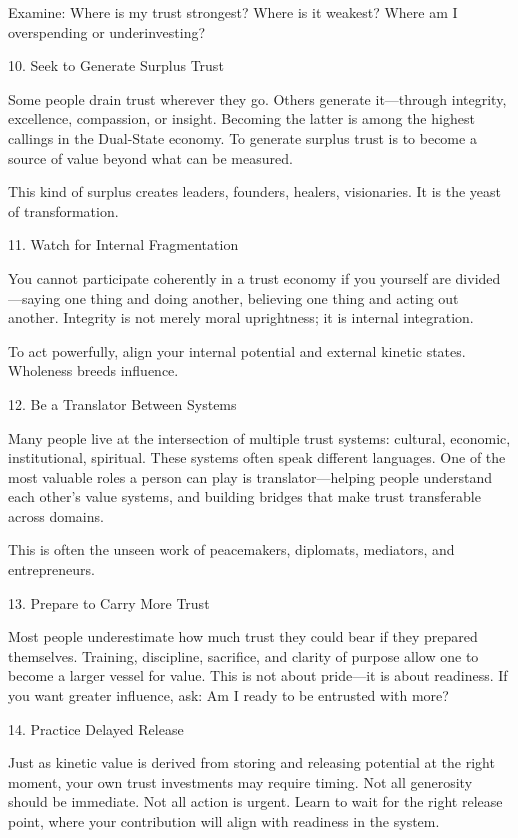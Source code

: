 \documentclass[11pt,oneside]{book}
\begin{document}
Examine: Where is my trust strongest? Where is it weakest? Where am I overspending or underinvesting?

10. Seek to Generate Surplus Trust


Some people drain trust wherever they go. Others generate it—through integrity, excellence, compassion, or insight. Becoming the latter is among the highest callings in the Dual-State economy. To generate surplus trust is to become a source of value beyond what can be measured.

This kind of surplus creates leaders, founders, healers, visionaries. It is the yeast of transformation.

11. Watch for Internal Fragmentation


You cannot participate coherently in a trust economy if you yourself are divided—saying one thing and doing another, believing one thing and acting out another. Integrity is not merely moral uprightness; it is internal integration.

To act powerfully, align your internal potential and external kinetic states. Wholeness breeds influence.

12. Be a Translator Between Systems


Many people live at the intersection of multiple trust systems: cultural, economic, institutional, spiritual. These systems often speak different languages. One of the most valuable roles a person can play is translator—helping people understand each other’s value systems, and building bridges that make trust transferable across domains.

This is often the unseen work of peacemakers, diplomats, mediators, and entrepreneurs.

13. Prepare to Carry More Trust


Most people underestimate how much trust they could bear if they prepared themselves. Training, discipline, sacrifice, and clarity of purpose allow one to become a larger vessel for value. This is not about pride—it is about readiness. If you want greater influence, ask: Am I ready to be entrusted with more?

14. Practice Delayed Release


Just as kinetic value is derived from storing and releasing potential at the right moment, your own trust investments may require timing. Not all generosity should be immediate. Not all action is urgent. Learn to wait for the right release point, where your contribution will align with readiness in the system.
\end{document}
